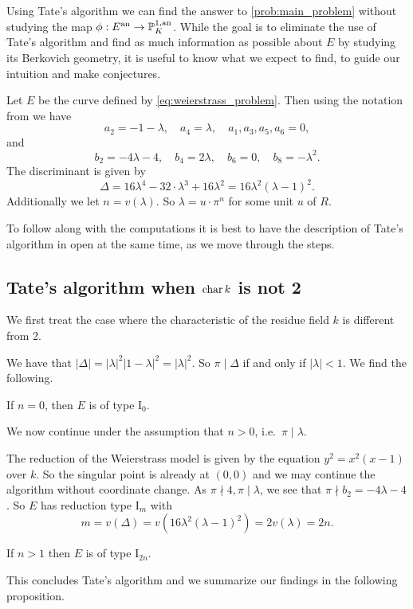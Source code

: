 Using Tate's algorithm we can find the answer to \cref{prob:main_problem} without studying the map $\phi: E\an \to \pro^{1, \text{an}}_K$. 
While the goal is to eliminate the use of Tate's algorithm and find as much information as possible about $E$ by studying its Berkovich geometry, 
it is useful to know what we expect to find, to guide our intuition and make conjectures. 

Let $E$ be the curve defined by \eqref{eq:weierstrass_problem}. 
Then using the notation from \cite[p.364]{silvermanAdvancedTopicsArithmetic1994} we have \[
a_2 = -1 - \lambda,\quad a_4 = \lambda, \quad a_1, a_3, a_5, a_6 = 0
,\] 
and \[
b_2 = -4 \lambda - 4, \quad b_4 = 2\lambda, \quad b_6 = 0, \quad b_8 = -\lambda ^2
.\] 
The discriminant is given by \[
	\Delta = 16\lambda^4 - 32\cdot \lambda^3 + 16\lambda^2 = 16 \lambda^2(\lambda - 1)^2
.\] 
Additionally we let $n = v(\lambda)$.
So $\lambda = u \cdot \pi^{n}$ for some unit $u$ of $R$.

To follow along with the computations it is best to have the description of Tate's algorithm in \cite[sec. IV.9]{silvermanAdvancedTopicsArithmetic1994} open at the same time, as we move through the steps. 

\subsection{Tate's algorithm when $\operatorname{char} k$ is not 2} \label{sec:char_k_is_not_2}
We first treat the case where the characteristic of the residue field $k$ is different from 2. 

We have that $|\Delta| = |\lambda|^2 |1-\lambda|^2 = |\lambda|^2 $. 
So $\pi \mid \Delta$ if and only if  $|\lambda| < 1$. 
We find the following. 
\begin{tateconclusion}
	If  $n = 0$, then $E$ is of type $\mathrm I_0$. 
\end{tateconclusion}
We now continue under the assumption that $n > 0$, i.e.\ $\pi \mid \lambda$. 

The reduction of the Weierstrass model is given by the equation $y^2 = x^2 (x - 1)$ over $k$. 
So the singular point is already at $(0, 0)$ and we may continue the algorithm without coordinate change. 
As $\pi \nmid 4, \pi \mid \lambda$, we see that $\pi \nmid b_2 = -4\lambda - 4$. 
So $E$ has reduction type $\mathrm I_m$ with \[
	m = v(\Delta) = v(16 \lambda^2 (\lambda - 1)^2)  = 2v(\lambda) = 2n
.\]
\begin{tateconclusion}
	If $n > 1$ then $E$ is of type $\mathrm I_{2n}$.
\end{tateconclusion}
This concludes Tate's algorithm and we summarize our findings in the following proposition. 

